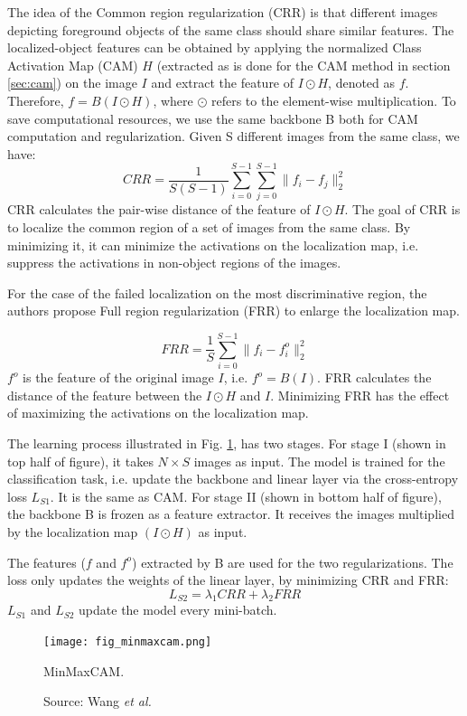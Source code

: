The idea of the Common region regularization (CRR) is that different images depicting foreground objects of the same class should share similar features. The localized-object features can be obtained by applying the normalized Class Activation Map (CAM) $H$ (extracted as is done for the CAM method in section \ref{sec:cam}) on the image $I$ and extract the feature of $I \odot H$, denoted as $f$. Therefore, $f = B(I \odot H)$, where $\odot$ refers to the element-wise multiplication. To save computational resources, we use the same backbone B both for CAM computation and regularization. Given S different images from the same class, we have:
\begin{equation}
    CRR = \frac{1}{S(S-1)} \sum^{S-1}_{i=0} \sum^{S-1}_{j=0} \lVert f_i - f_j \rVert^2_2
\end{equation}
CRR calculates the pair-wise distance of the feature of $I \odot H$. The goal of CRR is to localize the common region of a set of images from the same class. By minimizing it, it can minimize the activations on the localization map, i.e. suppress the activations in non-object regions of the images.

For the case of the failed localization on the most discriminative region, the authors propose Full region regularization (FRR) to enlarge the localization map.

\begin{equation}
    FRR = \frac{1}{S} \sum^{S-1}_{i=0}\lVert f_i - f^o_i \rVert^2_2
\end{equation}
$f^o$ is the feature of the original image $I$, i.e. $f^o=B(I)$. FRR calculates the distance of the feature between the $I \odot H$ and $I$. Minimizing FRR has the effect of maximizing the activations on the localization map.

The learning process illustrated in Fig. \ref{fig:minmaxcam}, has two stages. For stage I (shown in top half of figure), it takes $N \times S$ images as input. The model is trained for the classification task, i.e. update the backbone and linear layer via the cross-entropy loss $L_{S1}$. It is the same as CAM. For stage II (shown in bottom half of figure), the backbone B is frozen as a feature extractor. It receives the images multiplied by the localization map $(I \odot H)$ as input.

The features ($f$ and $f^o$) extracted by B are used for the two regularizations. The loss only updates the weights of the linear layer, by minimizing CRR and FRR:
\begin{equation}
    L_{S2} = \lambda_{1}CRR + \lambda_{2}FRR
\end{equation} 
$L_{S1}$ and $L_{S2}$ update the model every mini-batch.
\begin{figure}[ht]
    \begin{center}       
    \texttt{[image: fig\_minmaxcam.png]}
    \caption[MinMaxCAM]{MinMaxCAM.}
    \caption*{Source: Wang \textit{et al.} \cite{wang2021minmaxcam}}
    \label{fig:minmaxcam}
    \end{center}
\end{figure}

